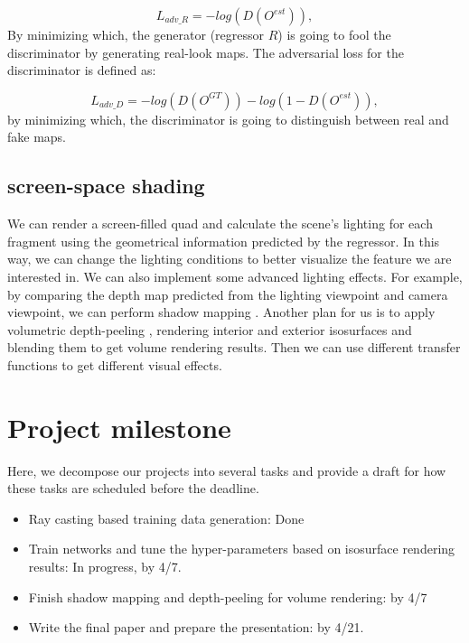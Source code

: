 \documentclass[journal]{vgtc}                %
\begin{document}
\begin{equation}
L_{adv\_R} = -log(D(O^{est})), 
\end{equation}
By minimizing which, the generator (regressor $R$) is going to fool the discriminator by generating real-look maps. The adversarial loss for the discriminator is defined as:

\begin{equation}
L_{adv\_D} = -log(D(O^{GT}))-log(1-D(O^{est})), 
\end{equation}
by minimizing which, the discriminator is going to distinguish between real and fake maps. 

\subsection{screen-space shading}
\label{subsection:shading}
We can render a screen-filled quad and calculate the scene's lighting for each fragment using the geometrical information predicted by the regressor. In this way, we can change the lighting conditions to better visualize the feature we are interested in. We can also implement some advanced lighting effects. For example, by comparing the depth map predicted from the lighting viewpoint and camera viewpoint, we can perform shadow mapping \cite{williams1978casting}. Another plan for us is to apply volumetric depth-peeling \cite{zolt2003depthpeel},  rendering interior and exterior isosurfaces and blending them to get volume rendering results. Then we can use different transfer functions to get different visual effects.  


\section{Project milestone}

Here, we decompose our projects into several tasks and provide a draft for how these tasks are scheduled before the deadline.

\begin{itemize}
\item Ray casting based training data generation: Done
\item Train networks and tune the hyper-parameters based on isosurface rendering results: In progress, by 4/7.
\item Finish shadow mapping and depth-peeling for volume rendering: by 4/7
\item Write the final paper and prepare the presentation: by 4/21. 

\end{itemize}

%

%
%
%


\end{document}

